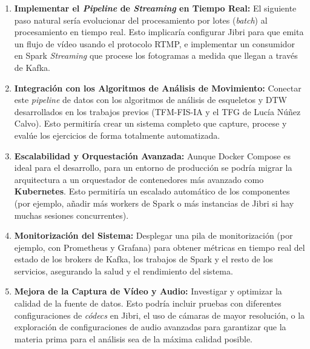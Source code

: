 \begin{enumerate}
    \item \textbf{Implementar el \textit{Pipeline} de \textit{Streaming} en Tiempo Real:} El siguiente paso natural sería evolucionar del procesamiento por lotes (\textit{batch}) al procesamiento en tiempo real. Esto implicaría configurar Jibri para que emita un flujo de vídeo usando el protocolo RTMP, e implementar un consumidor en Spark \textit{Streaming} que procese los fotogramas a medida que llegan a través de Kafka.
    
    \item \textbf{Integración con los Algoritmos de Análisis de Movimiento:} Conectar este \textit{pipeline} de datos con los algoritmos de análisis de esqueletos y DTW desarrollados en los trabajos previos (TFM-FIS-IA y el TFG de Lucía Núñez Calvo). Esto permitiría crear un sistema completo que capture, procese y evalúe los ejercicios de forma totalmente automatizada.
    
    \item \textbf{Escalabilidad y Orquestación Avanzada:} Aunque Docker Compose es ideal para el desarrollo, para un entorno de producción se podría migrar la arquitectura a un orquestador de contenedores más avanzado como \textbf{Kubernetes}. Esto permitiría un escalado automático de los componentes (por ejemplo, añadir más workers de Spark o más instancias de Jibri si hay muchas sesiones concurrentes).
    
    \item \textbf{Monitorización del Sistema:} Desplegar una pila de monitorización (por ejemplo, con Prometheus y Grafana) para obtener métricas en tiempo real del estado de los brokers de Kafka, los trabajos de Spark y el resto de los servicios, asegurando la salud y el rendimiento del sistema.

    \item \textbf{Mejora de la Captura de Vídeo y Audio:} Investigar y optimizar la calidad de la fuente de datos. Esto podría incluir pruebas con diferentes configuraciones de \textit{códecs} en Jibri, el uso de cámaras de mayor resolución, o la exploración de configuraciones de audio avanzadas para garantizar que la materia prima para el análisis sea de la máxima calidad posible.
    
\end{enumerate}
